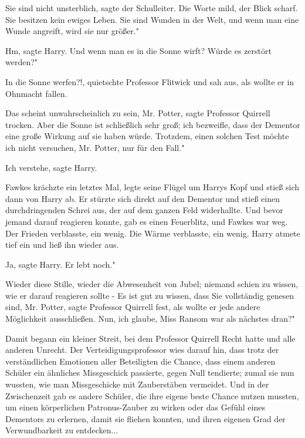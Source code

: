 \glqq{}Sie sind nicht unsterblich\grqq{}, sagte der Schulleiter. Die Worte mild,
der Blick scharf. \glqq{}Sie besitzen kein ewiges Leben. Sie sind Wunden in der
Welt, und wenn man eine Wunde angreift, wird sie nur größer."

\glqq{}Hm\grqq{}, sagte Harry. \glqq{}Und wenn man es in die Sonne wirft? Würde es
zerstört werden?"

\glqq{}In die Sonne werfen?!\grqq{}, quietschte Professor Flitwick und sah aus,
als wollte er in Ohnmacht fallen.

\glqq{}Das scheint unwahrscheinlich zu sein, Mr. Potter\grqq{}, sagte Professor
Quirrell trocken. \glqq{}Aber die Sonne ist schließlich sehr groß; ich bezweifle,
dass der Dementor eine große Wirkung auf sie haben würde. Trotzdem, einen
solchen Test möchte ich nicht versuchen, Mr. Potter, nur für den Fall."

\glqq{}Ich verstehe\grqq{}, sagte Harry.

Fawkes krächzte ein letztes Mal, legte seine Flügel um Harrys Kopf und stieß
sich dann von Harry ab. Er stürzte sich direkt auf den Dementor und stieß einen
durchdringenden Schrei aus, der auf dem ganzen Feld widerhallte. Und bevor
jemand darauf reagieren konnte, gab es einen Feuerblitz, und Fawkes war weg. Der
Frieden verblasste, ein wenig. Die Wärme verblasste, ein wenig. Harry atmete
tief ein und ließ ihn wieder aus.

\glqq{}Ja\grqq{}, sagte Harry. \glqq{}Er lebt noch."

Wieder diese Stille, wieder die Abwesenheit von Jubel; niemand schien zu wissen,
wie er darauf reagieren sollte - \glqq{}Es ist gut zu wissen, dass Sie
vollständig genesen sind, Mr. Potter\grqq{}, sagte Professor Quirrell fest, als
wollte er jede andere Möglichkeit ausschließen. \glqq{}Nun, ich glaube, Miss
Ransom war als nächstes dran?"

Damit begann ein kleiner Streit, bei dem Professor Quirrell Recht hatte und alle
anderen Unrecht. Der Verteidigungsprofessor wies darauf hin, dass trotz der
verständlichen Emotionen aller Beteiligten die Chance, dass einem anderen
Schüler ein ähnliches Missgeschick passierte, gegen Null tendierte; zumal sie
nun wussten, wie man Missgeschicke mit Zauberstäben vermeidet. Und in der
Zwischenzeit gab es andere Schüler, die ihre eigene beste Chance nutzen mussten,
um einen körperlichen Patronus-Zauber zu wirken oder das Gefühl eines Dementors
zu erlernen, damit sie fliehen konnten, und ihren eigenen Grad der
Verwundbarkeit zu entdecken...

